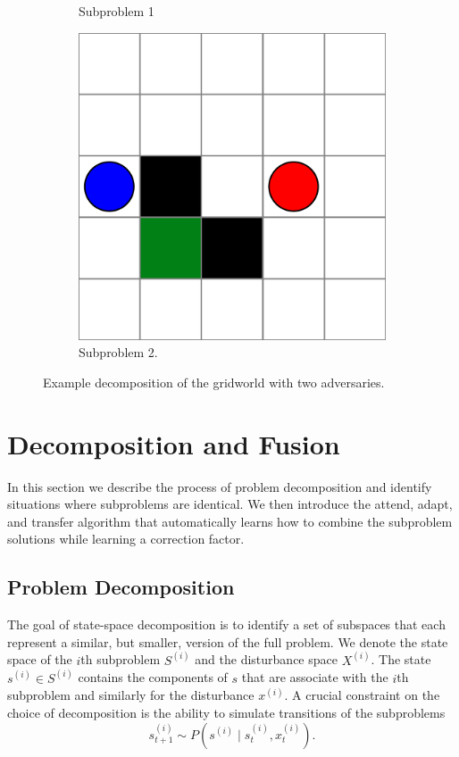 \begin{figure}
\begin{subfigure}[b]{0.25\textwidth}
        \caption{Subproblem 1}
        \label{fig:ch6_subg1}
    \end{subfigure}
    \hfill
    \begin{subfigure}[b]{0.25\textwidth}
        \centering
        \includegraphics[width=\textwidth]{figures/scene_decomposition/g_sub2.pdf}
        \caption{Subproblem 2.}
        \label{fig:ch6_subg2}
    \end{subfigure}
    \caption{Example decomposition of the gridworld with two adversaries.}
    \label{fig:adv_gridworld_decomp}
\end{figure}

\section{Decomposition and Fusion}
In this section we describe the process of problem decomposition and identify situations where subproblems are identical. We then introduce the attend, adapt, and transfer algorithm that automatically learns how to combine the subproblem solutions while learning a correction factor. 

\subsection{Problem Decomposition}
The goal of state-space decomposition is to identify a set of subspaces that each represent a similar, but smaller, version of the full problem. We denote the state space of the $i$th subproblem $S^{(i)}$ and the disturbance space $X^{(i)}$. The state $s^{(i)} \in S^{(i)}$ contains the components of $s$ that are associate with the $i$th subproblem and similarly for the disturbance $x^{(i)}$. A crucial constraint on the choice of decomposition is the ability to simulate transitions of the subproblems
\begin{equation}
    s_{t+1}^{(i)} \sim P( s^{(i)} \mid s_t^{(i)}, x_t^{(i)} ) \text{.}
\end{equation}

